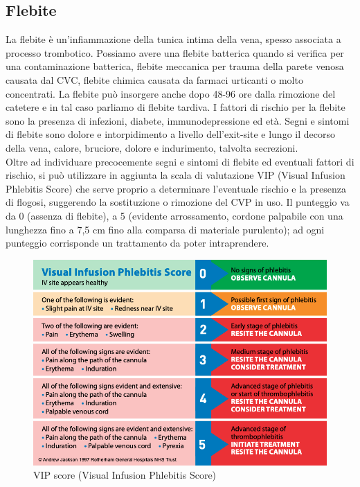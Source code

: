 \subsection{Flebite}

La flebite è un’infiammazione della tunica intima della vena, spesso associata a processo trombotico. 
Possiamo avere una flebite batterica quando si verifica per una contaminazione batterica, flebite meccanica per 
trauma della parete venosa causata dal CVC, flebite chimica causata da farmaci urticanti o molto concentrati. 
La flebite può insorgere anche dopo 48-96 ore dalla rimozione del catetere e in tal caso parliamo di flebite tardiva. 
I fattori di rischio per la flebite sono la presenza di infezioni, diabete, immunodepressione ed età. 
Segni e sintomi di flebite sono dolore e intorpidimento a livello dell’exit-site e lungo il decorso della vena, 
calore, bruciore, dolore e indurimento, talvolta secrezioni\cite{AIOMCVC}.\\
Oltre ad individuare precocemente segni e sintomi di flebite ed eventuali fattori di rischio, si può utilizzare 
in aggiunta la scala di valutazione VIP (Visual Infusion Phlebitis Score) che serve proprio a determinare l'eventuale 
rischio e la presenza di flogosi, suggerendo la sostituzione o rimozione del CVP in uso. Il punteggio va da 0 
(assenza di flebite), a 5 (evidente arrossamento, cordone palpabile con una lunghezza fino a 7,5 cm 
fino alla comparsa di materiale purulento); ad ogni punteggio corrisponde un trattamento da poter intraprendere\cite{FNOPIRIVISTA}.

\begin{figure}[H]
    \begin{center}
    \includegraphics[width=0.6\columnwidth]{img/VIPSCORE.png}
    \end{center}
    \caption[VIP score (Visual Infusion Phlebitis Score)]{VIP score (Visual Infusion Phlebitis Score)
    \cite{img52}}

\end{figure}

